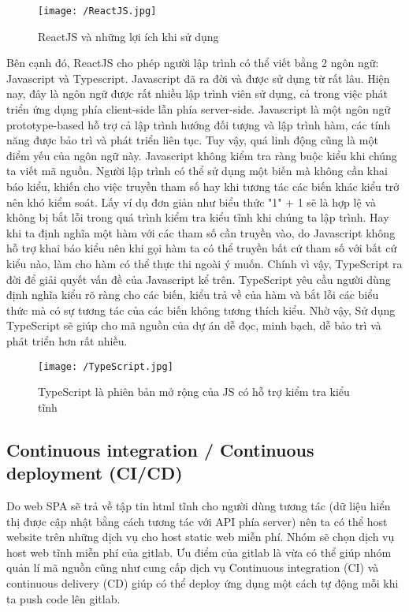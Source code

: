 		\begin{figure}[H]
			\texttt{[image: /ReactJS.jpg]}
			\centering
			\linebreak
			\caption{ReactJS và những lợi ích khi sử dụng \cite{ReactJSbenefits}}
		\end{figure}
		
		Bên cạnh đó, ReactJS cho phép người lập trình có thể viết bằng 2 ngôn ngữ: Javascript và Typescript. Javascript đã ra đời và được sử dụng từ rất lâu. Hiện nay, đây là ngôn ngữ được rất nhiều lập trình viên sử dụng, cả trong việc phát triển ứng dụng phía client-side lẫn phía server-side. Javascript là một ngôn ngữ prototype-based hỗ trợ cả lập trình hướng đối tượng và lập trình hàm, các tính năng được bảo trì và phát triển liên tục. Tuy vậy, quá linh động cũng là một điểm yếu của ngôn ngữ này. Javascript không kiểm tra ràng buộc kiểu khi chúng ta viết mã nguồn. Người lập trình có thể sử dụng một biến mà không cần khai báo kiểu, khiến cho việc truyền tham số hay khi tương tác các biến khác kiểu trở nên khó kiểm soát. Lấy ví dụ đơn giản như biểu thức "1" + 1 sẽ là hợp lệ và không bị bắt lỗi trong quá trình kiểm tra kiểu tĩnh khi chúng ta lập trình. Hay khi ta định nghĩa một hàm với các tham số cần truyền vào, do Javascript không hỗ trợ khai báo kiểu nên khi gọi hàm ta có thể truyền bất cứ tham số với bất cứ kiểu nào, làm cho hàm có thể thực thi ngoài ý muốn. Chính vì vậy, TypeScript ra đời để giải quyết vấn đề của Javascript kể trên. TypeScript yêu cầu người dùng định nghĩa kiểu rõ ràng cho các biến, kiểu trả về của hàm và bắt lỗi các biểu thức mà có sự tương tác của các biến không tương thích kiểu. Nhờ vậy, Sử dụng TypeScript sẽ giúp cho mã nguồn của dự án dễ đọc, minh bạch, dễ bảo trì và phát triển hơn rất nhiều.
		
		\begin{figure}[H]
			\texttt{[image: /TypeScript.jpg]}
			\centering
			\linebreak
			\caption{TypeScript là phiên bản mở rộng của JS có hỗ trợ kiểm tra kiểu tĩnh}
		\end{figure}
	
        \subsection{Continuous integration / Continuous deployment (CI/CD)}	
		Do web SPA sẽ trả về tập tin html tĩnh cho người dùng tương tác (dữ liệu hiển thị được cập nhật bằng cách tương tác với API phía server) nên ta có thể host website trên những dịch vụ cho host static web miễn phí. Nhóm sẽ chọn dịch vụ host web tĩnh miễn phí của gitlab. Ưu điểm của gitlab là vừa có thể giúp nhóm quản lí mã nguồn cũng như cung cấp dịch vụ Continuous integration (CI) và continuous delivery (CD) giúp có thể deploy ứng dụng một cách tự động mỗi khi ta push code lên gitlab.\\
		
